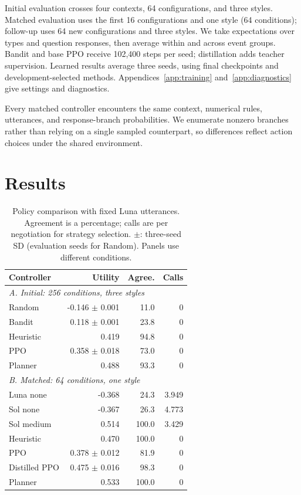 Initial evaluation crosses four contexts, 64 configurations, and three styles. Matched evaluation uses the first 16 configurations and one style (64 conditions); follow-up uses 64 new configurations and three styles. We take expectations over types and question responses, then average within and across event groups. Bandit and base PPO receive 102,400 steps per seed; distillation adds teacher supervision. Learned results average three seeds, using final checkpoints and development-selected methods. Appendices~\ref{app:training} and~\ref{app:diagnostics} give settings and diagnostics.

Every matched controller encounters the same context, numerical rules, utterances, and response-branch probabilities. We enumerate nonzero branches rather than relying on a single sampled counterpart, so differences reflect action choices under the shared environment.

\section{Results}

\begin{table}[t]
\centering\small
\setlength{\tabcolsep}{3pt}
\begin{tabular}{lrrr}
\toprule
Controller & Utility & Agree. & Calls \\
\midrule
\multicolumn{4}{l}{\textit{A. Initial: 256 conditions, three styles}} \\
Random & -0.146 $\pm$ 0.001 & 11.0 & 0 \\
Bandit & 0.118 $\pm$ 0.001 & 23.8 & 0 \\
Heuristic & 0.419 & 94.8 & 0 \\
PPO & 0.358 $\pm$ 0.018 & 73.0 & 0 \\
Planner & 0.488 & 93.3 & 0 \\
\midrule
\multicolumn{4}{l}{\textit{B. Matched: 64 conditions, one style}} \\
Luna none & -0.368 & 24.3 & 3.949 \\
Sol none & -0.367 & 26.3 & 4.773 \\
Sol medium & 0.514 & 100.0 & 3.429 \\
Heuristic & 0.470 & 100.0 & 0 \\
PPO & 0.378 $\pm$ 0.012 & 81.9 & 0 \\
Distilled PPO & 0.475 $\pm$ 0.016 & 98.3 & 0 \\
Planner & 0.533 & 100.0 & 0 \\
\bottomrule
\end{tabular}
\caption{Policy comparison with fixed Luna utterances. Agreement is a percentage; calls are per negotiation for strategy selection. $\pm$: three-seed SD (evaluation seeds for Random). Panels use different conditions.}
\label{tab:policies}
\end{table}

